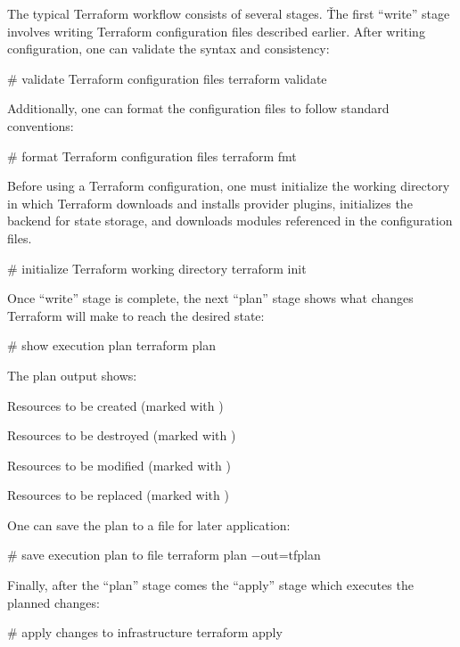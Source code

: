 The typical Terraform workflow consists of several stages. \v

The first ``write'' stage involves writing Terraform configuration files described earlier. After writing configuration,
one can validate the syntax and consistency:

\begin{bash}
# validate Terraform configuration files
terraform validate
\end{bash}

Additionally, one can format the configuration files to follow standard conventions:

\begin{bash}
# format Terraform configuration files
terraform fmt
\end{bash}

Before using a Terraform configuration, one must initialize the working directory in which Terraform downloads and
installs provider plugins, initializes the backend for state storage, and downloads modules referenced in the
configuration files.

\begin{bash}
# initialize Terraform working directory
terraform init
\end{bash}

Once ``write'' stage is complete, the next ``plan'' stage shows what changes Terraform will make to reach the desired
state:

\begin{bash}
# show execution plan
terraform plan
\end{bash}

The plan output shows:
\bit
\item Resources to be created (marked with \code{+})
\item Resources to be destroyed (marked with \code{$-$})
\item Resources to be modified (marked with \code{$\sim$})
\item Resources to be replaced (marked with \code{$-$/+})
\eit

One can save the plan to a file for later application:

\begin{bash}
# save execution plan to file
terraform plan $-$out=tfplan
\end{bash}

Finally, after the ``plan'' stage comes the ``apply'' stage which executes the planned changes:

\begin{bash}
# apply changes to infrastructure
terraform apply
\end{bash}

